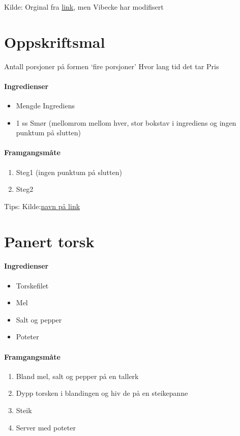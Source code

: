 \documentclass[12pt,a4paper]{book}
\begin{document}
{Kilde: Orginal fra \href{http://www.karolinegrovdal.no/?p=305}{link}, men Vibecke har modifisert
\clearpage{}
\clearpage{}\section{﻿Oppskriftsmal}
\label{oppskrifsmal}

Antall porsjoner på formen `fire porsjoner'
Hvor lang tid det tar
Pris 

\paragraph{Ingredienser}
\begin{itemize}[noitemsep]
	\item Mengde Ingrediens
	\item 1 ss Smør (mellomrom mellom hver, stor bokstav i ingrediens og ingen punktum på slutten)
\end{itemize}

\paragraph{Framgangsmåte}
\begin{enumerate}[noitemsep]
	\item Steg1 (ingen punktum på slutten)
	\item Steg2
\end{enumerate}

Tips:
Kilde:\href{https://link}{navn på link}
\clearpage{}
\clearpage{}\section{﻿Panert torsk}


\paragraph{Ingredienser}
\begin{itemize}[noitemsep]
	\item Torskefilet
	\item Mel
	\item Salt og pepper
	\item Poteter
\end{itemize}

\paragraph{Framgangsmåte}
\begin{enumerate}[noitemsep]
	\item Bland mel, salt og pepper på en tallerk
	\item Dypp torsken i blandingen og hiv de på en steikepanne
	\item Steik
	\item Server med poteter
\end{enumerate}


}
\end{document}
